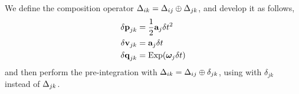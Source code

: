 We define the composition operator $\Delta_{ik} = \Delta_{ij}\oplus\Delta_{jk}$, and develop it as follows,
%
%
%
\begin{align}
\begin{split}
{\delta{\bf p}}_{jk} &= \frac12{\bf a}_j\delta t^2 \\
{\delta{\bf v}}_{jk} &= {\bf a}_j\delta t \\
{\delta{\bf q}}_{jk} &= \operatorname*{Exp}({{\bm \omega}}_j\delta t)
\end{split}
\end{align}
%
and then perform the pre-integration with $\Delta_{ik} = \Delta_{ij}\oplus\delta_{jk}$, using  with $\delta_{jk}$ instead of $\Delta_{jk}$.


